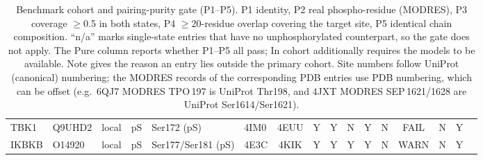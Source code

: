 \begin{table}[htbp]
{\begin{tabular}{lllll lcc ccccc ccl}
TBK1 & Q9UHD2 & local & pS & Ser172 (pS) & 4IM0 & 4EUU & Y & Y & N & Y & N & FAIL & N & Y &  \\
IKBKB & O14920 & local & pS & Ser177/Ser181 (pS) & 4E3C & 4KIK & Y & Y & Y & Y & N & WARN & N & Y &  \\
\bottomrule
\end{tabular}
}
\caption{Benchmark cohort and pairing-purity gate (P1--P5). P1 identity, P2 real phospho-residue (MODRES), P3 coverage $\geq$0.5 in both states, P4 $\geq$20-residue overlap covering the target site, P5 identical chain composition. ``n/a'' marks single-state entries that have no unphosphorylated counterpart, so the gate does not apply. The Pure column reports whether P1--P5 all pass; In cohort additionally requires the models to be available. Note gives the reason an entry lies outside the primary cohort. Site numbers follow UniProt (canonical) numbering; the MODRES records of the corresponding PDB entries use PDB numbering, which can be offset (e.g.\ 6QJ7 MODRES TPO\,197 is UniProt Thr198, and 4JXT MODRES SEP\,1621/1628 are UniProt Ser1614/Ser1621).}
\label{tab:benchmark}
\end{table}
